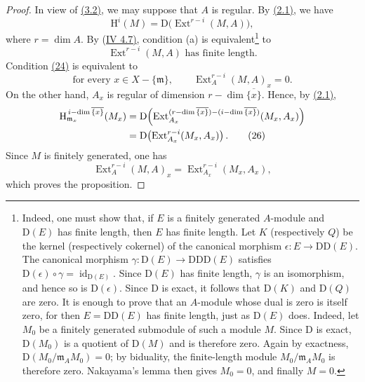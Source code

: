 \documentclass[11pt,a4paper,oneside]{book}
\providecommand{\Extop}{\operatorname{Ext}}
\providecommand{\HH}{\mathrm H}
\providecommand{\DD}{\mathrm D}
\theoremstyle{plain}
\theoremstyle{definition}
\theoremstyle{remark}
\begin{document}
\begin{proof}
\renewcommand{\qedsymbol}{}
In view of \textup{\hyperref[V.3.2]{(3.2)}}, we may suppose that $A$ is regular. By
\textup{\hyperref[V.2.1]{(2.1)}}, we have
\[
  \HH^i(M)=\DD\bigl(\Extop^{r-i}(M,A)\bigr),
\]
where $r=\dim A$. By \textup{(\hyperref[IV.4.7]{IV 4.7)}}, condition \textup{(a)} is
equivalent\footnote{Indeed, one must show that, if $E$ is a finitely generated
$A$-module and $\DD(E)$ has finite length, then $E$ has finite length. Let $K$
(respectively $Q$) be the kernel (respectively cokernel) of the canonical
morphism $\epsilon\colon E\to\DD\DD(E)$. The canonical morphism
$\gamma\colon\DD(E)\to\DD\DD\DD(E)$ satisfies
$\DD(\epsilon)\circ\gamma=\operatorname{id}_{\DD(E)}$. Since $\DD(E)$ has
finite length, $\gamma$ is an isomorphism, and hence so is
$\DD(\epsilon)$. Since $\DD$ is exact, it follows that $\DD(K)$ and
$\DD(Q)$ are zero. It is enough to prove that an $A$-module whose dual is zero
is itself zero, for then $E=\DD\DD(E)$ has finite length, just as $\DD(E)$
does. Indeed, let $M_0$ be a finitely generated submodule of such a module
$M$. Since $\DD$ is exact, $\DD(M_0)$ is a quotient of $\DD(M)$ and is
therefore zero. Again by exactness,
$\DD(M_0/\mathfrak m_A M_0)=0$; by biduality, the finite-length module
$M_0/\mathfrak m_A M_0$ is therefore zero. Nakayama's lemma then gives
$M_0=0$, and finally $M=0$.} to
\begin{equation}
  \Extop^{r-i}(M,A)\text{ has finite length}. \tag{24}\label{eq:V.24}
\end{equation}
Condition \textup{\hyperref[eq:V.24]{(24)}} is equivalent to
\begin{equation}
  \text{for every }x\in X-\{\mathfrak m\},\qquad
  \Extop_A^{r-i}(M,A)_x=0. \tag{25}\label{eq:V.25}
\end{equation}
On the other hand, $A_x$ is regular of dimension
$r-\dim\overline{\{x\}}$. Hence, by \textup{\hyperref[V.2.1]{(2.1)}},
\begin{align}
  \HH_{\mathfrak m_x}^{\,i-\dim\overline{\{x\}}}(M_x)
  &={\DD}\!\left(
    \Extop_{A_x}^{(r-\dim\overline{\{x\}})
      -(i-\dim\overline{\{x\}})}(M_x,A_x)
  \right) \notag\\
  &={\DD}\!\left(\Extop_{A_x}^{r-i}(M_x,A_x)\right). \tag{26}\label{eq:V.26}
\end{align}
Since $M$ is finitely generated, one has
\[
  \Extop_A^{r-i}(M,A)_x
  =\Extop_{A_x}^{r-i}(M_x,A_x),
\]
which proves the proposition.
\end{proof}
\end{document}

